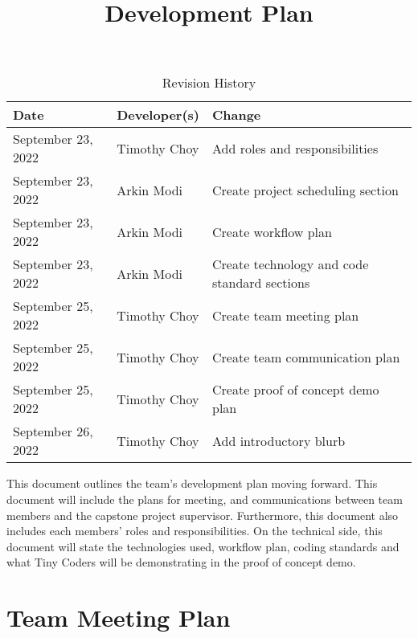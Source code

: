 \documentclass{article}
\title{Development Plan\\\progname}
\author{\authname}
\date{}
\begin{document}
\begin{table}[hp]
	\caption{Revision History} \label{TblRevisionHistory}
	\begin{tabularx}{\textwidth}{llX}
		\toprule
		\textbf{Date}      & \textbf{Developer(s)} & \textbf{Change}                              \\
		\midrule
		September 23, 2022 & Timothy Choy          & Add roles and responsibilities               \\
		September 23, 2022 & Arkin Modi            & Create project scheduling section            \\
		September 23, 2022 & Arkin Modi            & Create workflow plan                         \\
		September 23, 2022 & Arkin Modi            & Create technology and code standard sections \\
		September 25, 2022 & Timothy Choy          & Create team meeting plan                     \\
		September 25, 2022 & Timothy Choy          & Create team communication plan               \\
		September 25, 2022 & Timothy Choy          & Create proof of concept demo plan            \\
		September 26, 2022 & Timothy Choy          & Add introductory blurb                       \\
		\bottomrule
	\end{tabularx}
\end{table}

\newpage

\maketitle

This document outlines the team's development plan moving forward. This document will include the
plans for meeting, and communications between team members and the capstone project supervisor.
Furthermore, this document also includes each members' roles and responsibilities. On the technical
side, this document will state the technologies used, workflow plan, coding standards and what Tiny
Coders will be demonstrating in the proof of concept demo.

\section{Team Meeting Plan}
\end{document}
